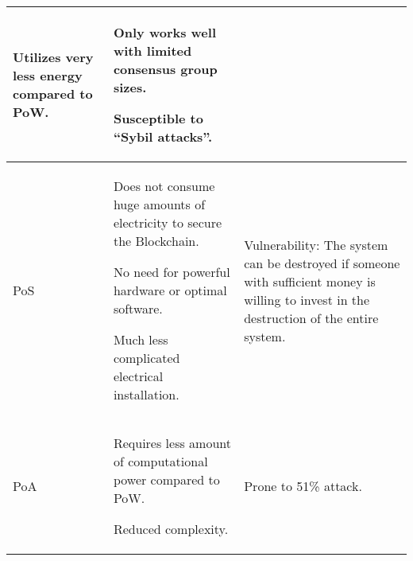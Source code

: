 \begin{table}[H]
\begin{tabular}{| m{2cm} | m{7cm} | m{7cm} |}
\begin{mylist}
							\item[\textminus] Utilizes very less energy compared to PoW.
						\end{mylist} & 
						\begin{mylist}
							\item[\textminus] Only works well with limited consensus group sizes.
							\item[\textminus] Susceptible to “Sybil attacks”.
						\end{mylist} \\
						\hline
						\begin{center}
							PoS
						\end{center} & 
						\begin{mylist}
							\item[\textminus] Does not consume huge amounts of electricity to secure the Blockchain. 
							\item[\textminus] No need for powerful hardware or optimal software.
							\item[\textminus] Much less complicated electrical installation.
						\end{mylist} & 
						\begin{mylist}
							\item[\textminus] Vulnerability: The system can be destroyed if someone with sufficient money is willing to invest in the destruction of the entire system.
						\end{mylist} \\
						\hline
						\begin{center}
							PoA
						\end{center} & 
						\begin{mylist}
							\item[\textminus] Requires less amount of computational power compared to PoW. 
							\item[\textminus] Reduced complexity.
						\end{mylist} & 
						\begin{mylist}
							\item[\textminus] Prone to 51\% attack.
						\end{mylist} \\
						\hline
					\end{tabular}
				\end{table}
				\newpage
				
